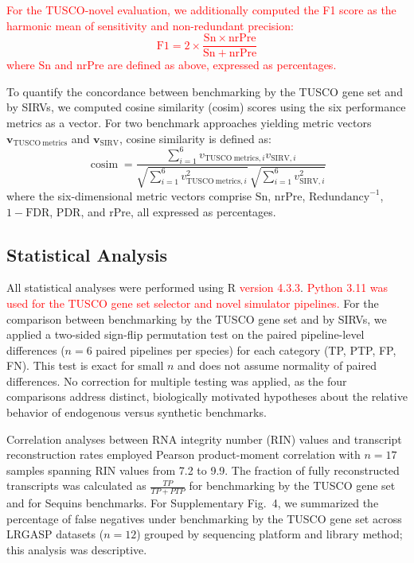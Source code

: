 \documentclass[pdflatex,sn-nature]{sn-jnl}%
\newcommand{\tuscoGeneSet}{TUSCO gene set}
\newcommand{\tuscoNovel}{TUSCO-novel}
\begin{document}
\textcolor{red}{For the \tuscoNovel{} evaluation, we additionally computed the F1 score as the harmonic mean of sensitivity and non-redundant precision:
\begin{equation}
\mathrm{F1} = 2 \times \frac{\mathrm{Sn} \times \mathrm{nrPre}}{\mathrm{Sn} + \mathrm{nrPre}}
\end{equation}
where $\mathrm{Sn}$ and $\mathrm{nrPre}$ are defined as above, expressed as percentages.}

To quantify the concordance between benchmarking by the \tuscoGeneSet{} and by SIRVs, we computed cosine similarity (cosim) scores using the six performance metrics as a vector. For two benchmark approaches yielding metric vectors $\boldsymbol{v}_{\mathrm{TUSCO\ metrics}}$ and $\boldsymbol{v}_{\mathrm{SIRV}}$, cosine similarity is defined as:
\begin{equation}
\operatorname{cosim} = \frac{\sum_{i=1}^{6} v_{\mathrm{TUSCO\ metrics}, i} v_{\mathrm{SIRV}, i}}{\sqrt{\sum_{i=1}^{6} v_{\mathrm{TUSCO\ metrics}, i}^2}\, \sqrt{\sum_{i=1}^{6} v_{\mathrm{SIRV}, i}^2}}
\end{equation}
where the six-dimensional metric vectors comprise $\mathrm{Sn}$, $\mathrm{nrPre}$, $\mathrm{Redundancy}^{-1}$, $1 - \mathrm{FDR}$, $\mathrm{PDR}$, and $\mathrm{rPre}$, all expressed as percentages.

\subsection{Statistical Analysis}

All statistical analyses were performed using R \textcolor{red}{version 4.3.3}. \textcolor{red}{Python 3.11 was used for the \tuscoGeneSet{} selector and novel simulator pipelines.} For the comparison between benchmarking by the \tuscoGeneSet{} and by SIRVs, we applied a two-sided sign-flip permutation test on the paired pipeline-level differences ($n=6$ paired pipelines per species) for each category (TP, PTP, FP, FN). This test is exact for small $n$ and does not assume normality of paired differences. No correction for multiple testing was applied, as the four comparisons address distinct, biologically motivated hypotheses about the relative behavior of endogenous versus synthetic benchmarks.

Correlation analyses between RNA integrity number (RIN) values and transcript reconstruction rates employed Pearson product-moment correlation with $n = 17$ samples spanning RIN values from 7.2 to 9.9. The fraction of fully reconstructed transcripts was calculated as $\frac{TP}{TP + PTP}$ for benchmarking by the \tuscoGeneSet{} and for Sequins benchmarks. For Supplementary Fig.~4, we summarized the percentage of false negatives under benchmarking by the \tuscoGeneSet{} across LRGASP datasets ($n = 12$) grouped by sequencing platform and library method; this analysis was descriptive.
\end{document}
